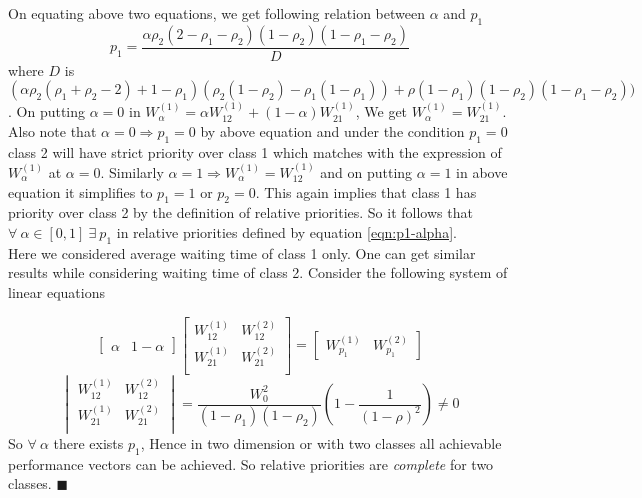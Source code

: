 \documentclass[a4paper,12pt]{article}
\newenvironment{mylemma}[1]{{ \textbf{\textit{Proof of Lemma #1:}}}}{}
\begin{document}
\begin{appendices}
\begin{mylemma}{\ref{clm:relprt2cls}}
\begin{equation}
\end{equation}
On equating above two equations, we get following relation between $\alpha$ and $p_1$
\begin{equation}
p_1 = \dfrac{\alpha \rho_2 (2-\rho_1 - \rho_2)(1-\rho_2)(1-\rho_1 - \rho_2)}{D}
\label{eqn:p1-alpha}
\end{equation} 
where $D$ is $(\alpha \rho_2(\rho_1+\rho_2-2)+ 1-\rho_1)(\rho_2(1-\rho_2) - \rho_1(1-\rho_1)) +\rho (1-\rho_1)(1-\rho_2)(1-\rho_1 - \rho_2))$. On putting $\alpha = 0$ in $W_{\alpha}^{(1)} = \alpha W_{12}^{(1)} + (1-\alpha)W_{21}^{(1)}$, We get $W_{\alpha}^{(1)} = W_{21}^{(1)}$. Also note that $\alpha = 0 \Rightarrow p_1 = 0 $ by above equation and under the condition $p_1 = 0$ class 2 will have strict priority over class 1 which matches with 
the expression of $W_{\alpha}^{(1)}$ at $\alpha = 0$. Similarly $\alpha = 1 \Rightarrow W_{\alpha}^{(1)} = W_{12}^{(1)} $ and on putting $\alpha= 1$ in above equation it simplifies to $p_1 = 1$ or $p_2 = 0$. This again implies that class 1 has priority over class 2 by the definition of relative priorities. So it follows that $\forall ~\alpha \in[0,1]~ \exists~ p_1$ in relative priorities defined by equation \ref{eqn:p1-alpha}.\\
\indent Here we considered average waiting time of class 1 only. One can get similar results while considering waiting time of class 2. Consider the following system of linear equations

$$\begin{bmatrix}
\alpha & 1 - \alpha
\end{bmatrix} \begin{bmatrix}
       W_{12}^{(1)} & W_{12}^{(2)}  \\
       W_{21}^{(1)} &  W_{21}^{(2)} \\
      
     \end{bmatrix} = \begin{bmatrix}
     W_{p_1}^{(1)} & W_{p_1}^{(2)}
     \end{bmatrix}$$
$$\begin{vmatrix}
 W_{12}^{(1)} & W_{12}^{(2)}  \\
       W_{21}^{(1)} &  W_{21}^{(2)} \\
      
\end{vmatrix} = \dfrac{W_0^2}{(1-\rho_1)(1-\rho_2)}\left(1 - \dfrac{1}{(1-\rho)^2}\right) \neq 0$$
So $\forall~\alpha$ there exists $p_1$, Hence in two dimension or with two classes all achievable performance vectors can be achieved. So relative priorities are \textit{complete} for two classes. \hspace{0.35in}$\blacksquare$
\end{mylemma}



\end{appendices}
\end{document}
